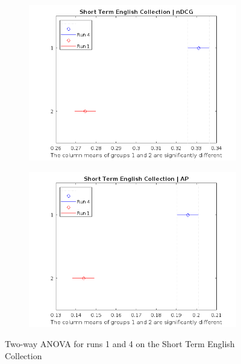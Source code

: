 \begin{figure}[!h]
    \centering
    \begin{subfigure}[b]{0.49\textwidth}
        \includegraphics[width=\textwidth]{figure/StatisticalAnalysis/ANOVA 2/ndcg-st-en.jpeg}
        \label{fig:st_anova_eng_ndcg}
    \end{subfigure}
    \hfill
    \begin{subfigure}[b]{0.49\textwidth}
        \includegraphics[width=\textwidth]{figure/StatisticalAnalysis/ANOVA 2/ap-st-en.jpeg}
        \label{fig:st_anova_eng_ap}
    \end{subfigure}
    \caption{Two-way ANOVA for runs 1 and 4 on the Short Term English Collection}
    \label{fig:st_anova_eng}
\end{figure}

